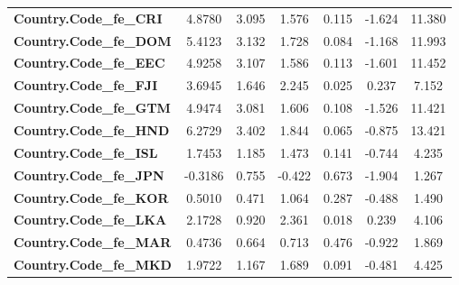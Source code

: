 \begin{center}
\begin{tabular}{lcccccc}
\textbf{Country.Code\_fe\_CRI}                                     &       4.8780  &        3.095     &     1.576  &         0.115        &       -1.624    &       11.380     \\
\textbf{Country.Code\_fe\_DOM}                                     &       5.4123  &        3.132     &     1.728  &         0.084        &       -1.168    &       11.993     \\
\textbf{Country.Code\_fe\_EEC}                                     &       4.9258  &        3.107     &     1.586  &         0.113        &       -1.601    &       11.452     \\
\textbf{Country.Code\_fe\_FJI}                                     &       3.6945  &        1.646     &     2.245  &         0.025        &        0.237    &        7.152     \\
\textbf{Country.Code\_fe\_GTM}                                     &       4.9474  &        3.081     &     1.606  &         0.108        &       -1.526    &       11.421     \\
\textbf{Country.Code\_fe\_HND}                                     &       6.2729  &        3.402     &     1.844  &         0.065        &       -0.875    &       13.421     \\
\textbf{Country.Code\_fe\_ISL}                                     &       1.7453  &        1.185     &     1.473  &         0.141        &       -0.744    &        4.235     \\
\textbf{Country.Code\_fe\_JPN}                                     &      -0.3186  &        0.755     &    -0.422  &         0.673        &       -1.904    &        1.267     \\
\textbf{Country.Code\_fe\_KOR}                                     &       0.5010  &        0.471     &     1.064  &         0.287        &       -0.488    &        1.490     \\
\textbf{Country.Code\_fe\_LKA}                                     &       2.1728  &        0.920     &     2.361  &         0.018        &        0.239    &        4.106     \\
\textbf{Country.Code\_fe\_MAR}                                     &       0.4736  &        0.664     &     0.713  &         0.476        &       -0.922    &        1.869     \\
\textbf{Country.Code\_fe\_MKD}                                     &       1.9722  &        1.167     &     1.689  &         0.091        &       -0.481    &        4.425     \\

\end{tabular}
\end{center}

